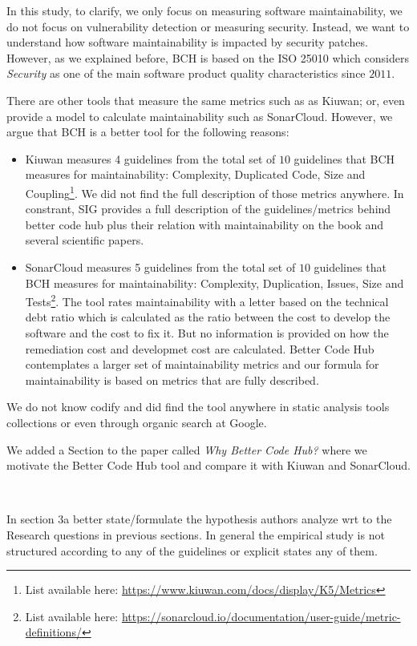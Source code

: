 \documentclass[11pt,fleqn]{article}
\newcommand{\eline}{\vspace*{.75\baselineskip}}
\newcommand{\Referee}[1]{\eline \noindent {\bf Reviewer comment #1:} \\}
\newenvironment{revcomment}[1][]
{\Referee{#1}\begin{rcomment}}
{\end{rcomment}}
\begin{document}
In this study, to clarify, we only focus on measuring software maintainability, we do not focus 
on vulnerability detection or measuring security. Instead, we want to understand how software 
maintainability is impacted by security patches. However, as we explained before, BCH is 
based on the ISO 25010 which considers \emph{Security} as one of the main software product quality 
characteristics since $2011$.

There are other tools that measure the same metrics such as as Kiuwan; or, even 
provide a model to calculate maintainability such as SonarCloud. However, we argue
that BCH is a better tool for the following reasons:

\begin{itemize}
    \item Kiuwan measures 4 guidelines from the total set of $10$
    guidelines that BCH measures for maintainability: Complexity, Duplicated 
    Code, Size and Coupling\footnote{List available here: \url{https://www.kiuwan.com/docs/display/K5/Metrics}}. 
    We did not find the full description of those metrics anywhere. In constrant, 
    SIG provides a full description of the guidelines/metrics behind better code
    hub plus their relation with maintainability on the book and several scientific papers. 
    \item SonarCloud measures 5 guidelines from the total set of $10$
    guidelines that BCH measures for maintainability: Complexity, Duplication, 
    Issues, Size and Tests\footnote{List available here: \url{https://sonarcloud.io/documentation/user-guide/metric-definitions/}}. 
    The tool rates maintainability with a letter based on the technical 
    debt ratio which is calculated as the ratio between the cost to develop 
    the software and the cost to fix it. But no information is provided 
    on how the remediation cost and developmet cost are calculated. 
    Better Code Hub contemplates a larger set of maintainability metrics 
    and our formula for maintainability is based on metrics that are 
    fully described.  
\end{itemize}

We do not know codify and did find the tool anywhere in static analysis tools 
collections or even through organic search at Google.  

We added a Section to 
the paper called \textit{Why Better Code Hub?} where we motivate the Better Code Hub tool and 
compare it with Kiuwan and SonarCloud.


\begin{revcomment}[3.2]

    In section 3a better state/formulate the hypothesis authors 
    analyze wrt to the Research questions in previous sections. 
    In general the empirical study is not structured according to any 
    of the guidelines or explicit states any of them. 

\end{revcomment}
\end{document}
